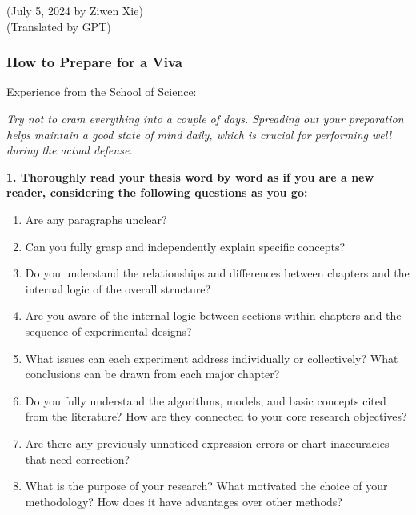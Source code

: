 \begin{flushright}
    (July 5, 2024 by Ziwen Xie) \\
    (Translated by GPT)
\end{flushright}

\subsubsection{How to Prepare for a Viva}

Experience from the School of Science:

\textit{Try not to cram everything into a couple of days. Spreading out your preparation helps maintain a good state of mind daily, which is crucial for performing well during the actual defense.}

\textbf{1. Thoroughly read your thesis word by word as if you are a new reader, considering the following questions as you go:}
\begin{enumerate}
    \item Are any paragraphs unclear?
    \item Can you fully grasp and independently explain specific concepts?
    \item Do you understand the relationships and differences between chapters and the internal logic of the overall structure?
    \item Are you aware of the internal logic between sections within chapters and the sequence of experimental designs?
    \item What issues can each experiment address individually or collectively? What conclusions can be drawn from each major chapter?
    \item Do you fully understand the algorithms, models, and basic concepts cited from the literature? How are they connected to your core research objectives?
    \item Are there any previously unnoticed expression errors or chart inaccuracies that need correction?
    \item What is the purpose of your research? What motivated the choice of your methodology? How does it have advantages over other methods?
\end{enumerate}

